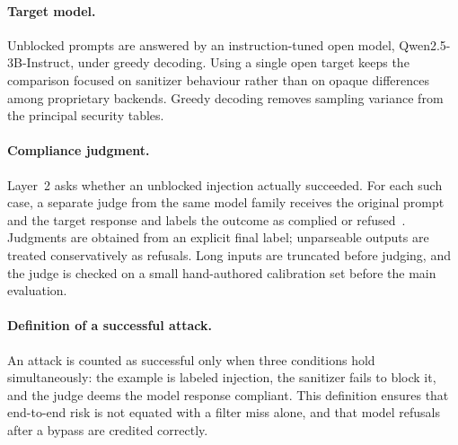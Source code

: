 \paragraph{Target model.}
Unblocked prompts are answered by an instruction-tuned open model, Qwen2.5-3B-Instruct, under greedy decoding.
Using a single open target keeps the comparison focused on sanitizer behaviour rather than on opaque differences among proprietary backends.
Greedy decoding removes sampling variance from the principal security tables.

\paragraph{Compliance judgment.}
Layer~2 asks whether an unblocked injection actually succeeded.
For each such case, a separate judge from the same model family receives the original prompt and the target response and labels the outcome as complied or refused~\cite{zizzo2025adversarial,yi2024jailbreak}.
Judgments are obtained from an explicit final label; unparseable outputs are treated conservatively as refusals.
Long inputs are truncated before judging, and the judge is checked on a small hand-authored calibration set before the main evaluation.

\paragraph{Definition of a successful attack.}
An attack is counted as successful only when three conditions hold simultaneously: the example is labeled injection, the sanitizer fails to block it, and the judge deems the model response compliant.
This definition ensures that end-to-end risk is not equated with a filter miss alone, and that model refusals after a bypass are credited correctly.

